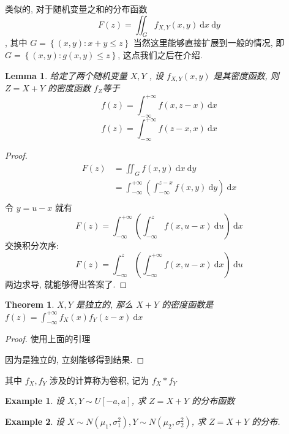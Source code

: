 \documentclass[a4paper, 10pt]{ctexart} %
\newtheorem{theorem}{Theorem}
\newtheorem{example}{\llap{$\rhd$ \space}Example}
\newtheorem{lemma}{Lemma}
\begin{document}
类似的, 对于随机变量之和的分布函数
\[ \displaystyle F \left(z\right) = \iint _{G} f_{X , Y} \left(x,  y\right) \ \mathrm{d}x \ \mathrm{d}y\] , 其中 $G = \left\{ \left(x,  y\right) : x + y \le z\right\}$
当然这里能够直接扩展到一般的情况, 即 $G=  \left\{ \left( x,  y\right) : g\left(x , y\right) \le z\right\}$, 这点我们之后在介绍.
\begin{lemma}
    给定了两个随机变量 $X, Y$ , 设 $f _{X,   Y   } \left(x,  y\right)$ 是其密度函数, 则 $Z = X +  Y$ 的密度函数 $f _{Z}$等于 
    \[
    f \left(z\right)   = \int  ^{ + \infty} _{ - \infty} f \left( x, z -x\right) \ \mathrm{d}x
    \]\[
    f \left(z\right) = \int  ^{ + \infty    } _{ - \infty } f \left(z -x , x \right) \ \mathrm{d}x
    \]
\end{lemma}
\begin{proof}
    \[
    \begin{aligned}
    F \left(z \right) & = \iint  _{G} f\left(x,  y\right)  \ \mathrm{d}x \ \mathrm{d}y \\ 
    & = \int ^{ + \infty  } _{ - \infty}  \left( \int  ^{ z -x} _{ - \infty } f \left(x, y\right) \ \mathrm{d}y\right)\ \mathrm{d}x\\
    \end{aligned}
    \] 令 $y  = u - x$ 就有 
    \[ F \left(z\right)  = \int  ^{+\infty} _{ - \infty} \left( \int  ^{z} _{-\infty } f \left(x, u -x \right) \ \mathrm{d}u \right) \ \mathrm{d}x
    \] 交换积分次序: 
    \[ F \left(z\right) = \int ^{z} _{- \infty } \left( \int  ^{ +\infty} _{ -\infty} f \left(x, u-x\right)\ \mathrm{d}x \right)\ \mathrm{d}u
    \] 两边求导, 就能够得出答案了.
\end{proof}

\begin{theorem}
    $X , Y$ 是独立的, 那么 $X + Y $ 的密度函数是 $f\left(z\right) = \displaystyle \int ^{ + \infty } _{-\infty  } f_{X} \left(x \right) f_{Y} \left(z - x\right) \ \mathrm{d} x$
\end{theorem}
\begin{proof}
    使用上面的引理

    因为是独立的, 立刻能够得到结果.
\end{proof}

其中 $f _{X} , f _{Y}$ 涉及的计算称为卷积, 记为 $f _{X} * f _Y$

\begin{example}
    设 $X , Y \sim U \left[ -a  ,a \right]$, 求 $Z = X + Y$ 的分布函数
\end{example}
\begin{example}
    设 $X \sim N\left( \mu_1, \sigma_1^{2} \right), Y \sim N \left( \mu_2 , \sigma_{2} ^{2}\right)$, 求 $Z = X + Y$ 的分布. 
\end{example}
\end{document}
